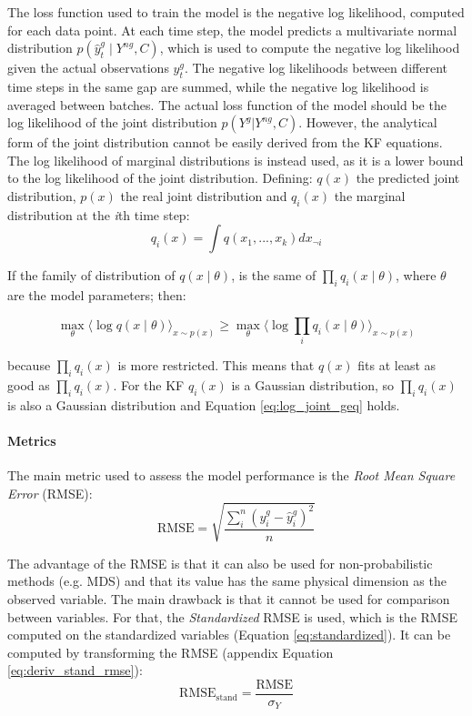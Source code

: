 \documentclass{article}
\newcommand{\E}[1]{\langle #1 \rangle} %
\begin{document}
The loss function used to train the model is the negative log likelihood, computed for each data point. At each time step, the model predicts a multivariate normal distribution $p(\hat{y}^g_t \mid Y^{ng}, C)$, which is used to compute the negative log likelihood given the actual observations $y_t^g$. The negative log likelihoods between different time steps in the same gap are summed, while the negative log likelihood is averaged between batches.
The actual loss function of the model should be the log likelihood of the joint distribution $p(Y^g|Y^{ng}, C)$. However, the analytical form of the joint distribution cannot be easily derived from the KF equations. The log likelihood of marginal distributions is instead used, as it is a lower bound to the log likelihood of the joint distribution. Defining: $q(x)$ the predicted joint distribution, $p(x)$ the real joint distribution and $q_i(x)$ the marginal distribution at the \textit{i}th time step:
\begin{equation*}
    q_i(x) = \int q(x_1, ..., x_k)dx_{\neg i}
\end{equation*}

If the family of distribution of $q(x \mid \theta)$,  is the same of $\prod_i q_i(x \mid \theta)$, where $\theta$ are the model parameters; then:

\begin{equation}\label{eq:log_joint_geq}
    \max_\theta \E{\log q(x\mid \theta)}_{x \sim p(x)} \geq \max_\theta \E{\log \prod_i q_i(x\mid \theta)}_{x \sim p(x)}
\end{equation}

because $\prod_i q_i(x)$ is more restricted. This means that $q(x)$ fits at least as good as $\prod_i q_i(x)$.
For the KF $q_i(x)$ is a Gaussian distribution, so $\prod_i q_i(x)$ is also a Gaussian distribution and Equation \ref{eq:log_joint_geq} holds.

\paragraph{Metrics} The main metric used to assess the model performance is the \emph{Root Mean Square Error} (RMSE):
\begin{equation*}
    \text{RMSE} = \sqrt{\frac{\sum_i^n (y^g_i - \hat{y}^g_i)^2}{n}}
\end{equation*}

The advantage of the RMSE is that it can also be used for non-probabilistic methods (e.g. MDS) and that its value has the same physical dimension as the observed variable. The main drawback is that it cannot be used for comparison between variables. For that, the \emph{Standardized} RMSE is used, which is the RMSE computed on the standardized variables (Equation \ref{eq:standardized}). It can be computed by transforming the RMSE (appendix Equation \ref{eq:deriv_stand_rmse}):
\begin{equation*}
    \text{RMSE}_{\text{stand}} = \frac{\text{RMSE}}{\sigma_Y}
\end{equation*}
\end{document}
